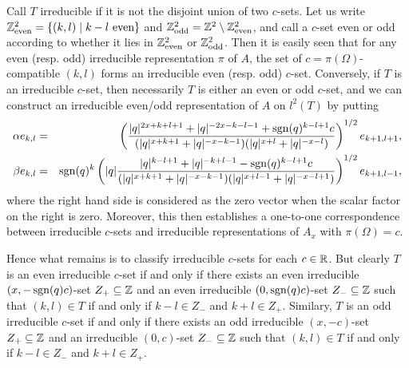 Call $T$ irreducible if it is not the disjoint union of two $c$-sets.  Let us write $\mathbb{Z}^2_{\mathrm{even}} = \{(k,l)\mid k-l \textrm{ even}\}$ and $\mathbb{Z}^2_{\mathrm{odd}} = \mathbb{Z}^2\setminus \mathbb{Z}^2_{\mathrm{even}}$, and call a $c$-set even or odd according to whether it lies in $\mathbb{Z}^2_{\mathrm{even}}$ or $\mathbb{Z}^2_{\mathrm{odd}}$. Then it is easily seen that for any even (resp. odd) irreducible representation $\pi$ of $A$, the set of $c=\pi(\Omega)$-compatible $(k,l)$ forms an irreducible even (resp. odd) $c$-set. Conversely, if $T$ is an irreducible $c$-set, then necessarily $T$ is either an even or odd $c$-set, and we can construct an irreducible even/odd representation of $A$ on $l^2(T)$ by putting \begin{eqnarray*} \alpha e_{k,l} &=&  \left(\frac{|q|^{2x+k+l+1}+|q|^{-2x-k-l-1}+\operatorname{\mathrm{sgn}}(q)^{k-l+1}c}{(|q|^{x+k+1}+|q|^{-x-k-1})(|q|^{x+l}+|q|^{-x-l})}\right)^{1/2}e_{k+1,l+1},\\ \beta e_{k,l} &=& \operatorname{\mathrm{sgn}}(q)^{k}\left(|q|\frac{|q|^{k-l+1}+|q|^{-k+l-1}-\operatorname{\mathrm{sgn}}(q)^{k-l+1}c}{(|q|^{x+k+1}+|q|^{-x-k-1})(|q|^{x+l-1}+|q|^{-x-l+1})}\right)^{1/2} e_{k+1,l-1},\end{eqnarray*} where the right hand side is considered as the zero vector when the scalar factor on the right is zero. Moreover, this then establishes a one-to-one correspondence between irreducible $c$-sets and irreducible representations of $A_x$ with $\pi(\Omega) =c$.

Hence what remains is to classify irreducible $c$-sets for each $c\in \mathbb{R}$. But clearly $T$ is an even irreducible $c$-set if and only if there exists an even irreducible $(x,-\operatorname{\mathrm{sgn}}(q)c)$-set $Z_+\subseteq \mathbb{Z}$ and an even irreducible $(0,\operatorname{\mathrm{sgn}}(q)c)$-set $Z_-\subseteq \mathbb{Z}$ such that $(k,l)\in T$ if and only if $k-l\in Z_-$ and $k+l\in Z_+$. Similary, $T$ is an odd irreducible $c$-set if and only if there exists an odd irreducible $(x,-c)$-set $Z_+\subseteq \mathbb{Z}$ and an irreducible $(0,c)$-set $Z_-\subseteq \mathbb{Z}$ such that $(k,l)\in T$ if and only if $k-l\in Z_-$ and $k+l\in Z_+$.








